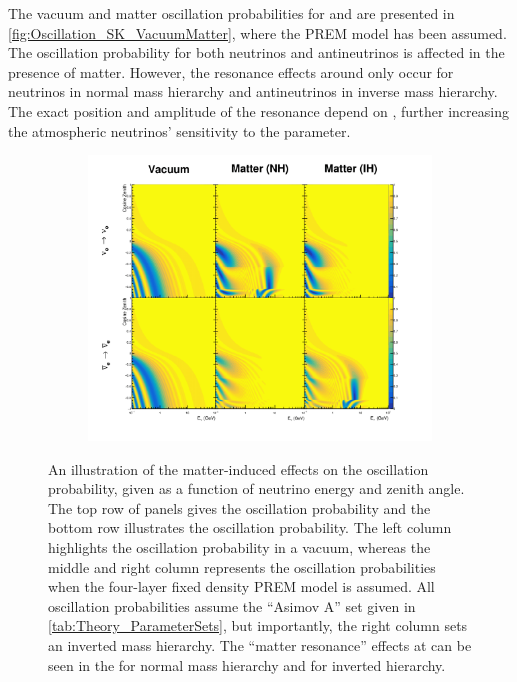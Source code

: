 The vacuum and matter oscillation probabilities for  and  are presented in \autoref{fig:Oscillation_SK_VacuumMatter}, where the PREM model has been assumed. The oscillation probability for both neutrinos and antineutrinos is affected in the presence of matter. However, the resonance effects around  only occur for neutrinos in normal mass hierarchy and antineutrinos in inverse mass hierarchy. The exact position and amplitude of the resonance depend on  , further increasing the atmospheric neutrinos' sensitivity to the parameter.

\begin{figure}[h]
  \begin{subfigure}[t]{\textwidth}
    \includegraphics[width=\textwidth, trim={0mm 0mm 0mm 0mm}, clip,page=1]{Figures/Oscillation/MatterEffect.pdf}
  \end{subfigure}
  \caption{An illustration of the matter-induced effects on the oscillation probability, given as a function of neutrino energy and zenith angle. The top row of panels gives the  oscillation probability and the bottom row illustrates the  oscillation probability. The left column highlights the oscillation probability in a vacuum, whereas the middle and right column represents the oscillation probabilities when the four-layer fixed density PREM model is assumed. All oscillation probabilities assume the ``Asimov A'' set given in \autoref{tab:Theory_ParameterSets}, but importantly, the right column sets an inverted mass hierarchy. The ``matter resonance'' effects at  can be seen in the  for normal mass hierarchy and  for inverted hierarchy.}
  \label{fig:Oscillation_SK_VacuumMatter}
\end{figure}

